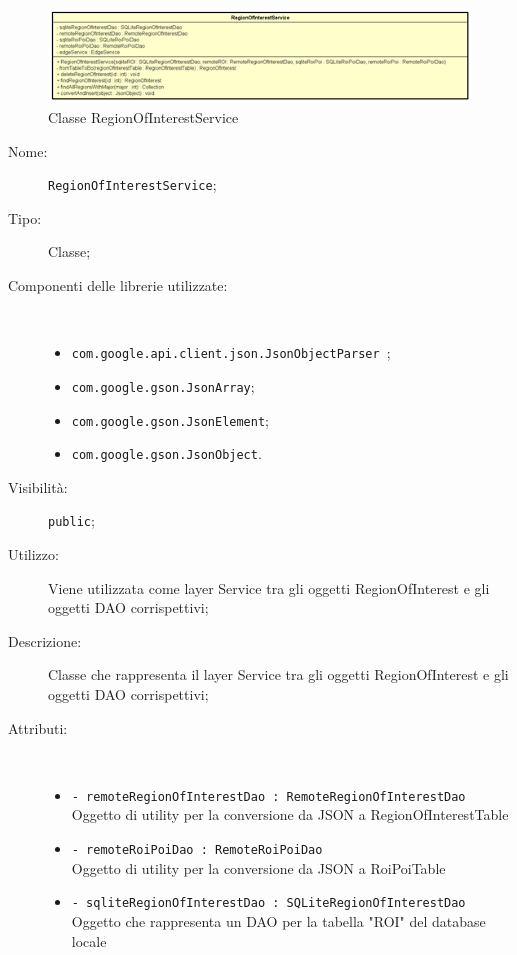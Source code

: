 \documentclass[../DefinizioneDiProdotto.tex]{subfiles}
\begin{document}
    \begin{figure}[H]
        \centering
        \includegraphics{img/RegionOfInterestService.png}
        \caption{Classe RegionOfInterestService}\label{fig:model::dataaccess::service::RegionOfInterestService} 
    \end{figure}
    \begin{description}
\item[Nome:] \texttt{RegionOfInterestService};
\item[Tipo:] Classe;
\item[Componenti delle librerie utilizzate:] \
\begin{itemize}
\item \texttt{com.google.api.client.json.JsonObjectParser
};

\item \texttt{com.google.gson.JsonArray};

\item \texttt{com.google.gson.JsonElement};

\item \texttt{com.google.gson.JsonObject}.

\end{itemize}
\item[Visibilità:] \texttt{public};
\item[Utilizzo:] Viene utilizzata come layer Service tra gli oggetti RegionOfInterest e gli oggetti DAO corrispettivi;
\item[Descrizione:] Classe che rappresenta il layer Service tra gli oggetti RegionOfInterest e gli oggetti DAO corrispettivi;
\item[Attributi:] \
\begin{itemize}
\item \texttt{- remoteRegionOfInterestDao : RemoteRegionOfInterestDao}\\
Oggetto di utility per la conversione da JSON a RegionOfInterestTable

\item \texttt{- remoteRoiPoiDao : RemoteRoiPoiDao}\\
Oggetto di utility per la conversione da JSON a RoiPoiTable

\item \texttt{- sqliteRegionOfInterestDao : SQLiteRegionOfInterestDao}\\
Oggetto che rappresenta un DAO per la tabella "ROI" del database locale


\end{itemize}
\end{description}
\end{document}
